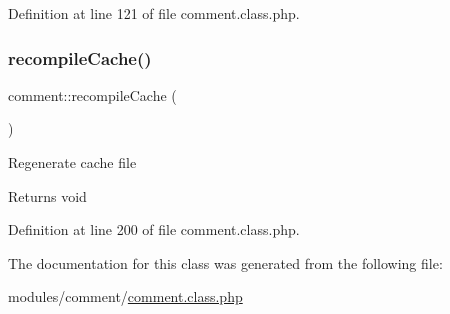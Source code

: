 Definition at line 121 of file comment.\+class.\+php.

\mbox{\label{classcomment_a904e04f286e217d550f26a38139107aa}} 
\subsubsection{\texorpdfstring{recompile\+Cache()}{recompileCache()}}
{\footnotesize\ttfamily comment\+::recompile\+Cache (\begin{DoxyParamCaption}{ }\end{DoxyParamCaption})}

Regenerate cache file \begin{DoxyReturn}{Returns}
void 
\end{DoxyReturn}


Definition at line 200 of file comment.\+class.\+php.



The documentation for this class was generated from the following file\+:\begin{DoxyCompactItemize}
\item 
modules/comment/\hyperlink{comment_8class_8php}{comment.\+class.\+php}\end{DoxyCompactItemize}
